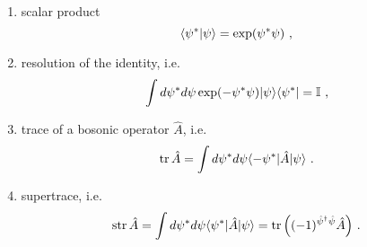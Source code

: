     \begin{enumerate}
        \item scalar product
            \begin{equation*}
                \langle\psi^*\vert\psi\rangle = \exp(\psi^* \psi) ~,
            \end{equation*}
        \item resolution of the identity, i.e. 
            \begin{equation*}
                \int d\psi^* d\psi \exp(- \psi^* \psi) \vert\psi\rangle \langle\psi^*\vert = \mathbb I ~,
            \end{equation*}
        \item trace of a bosonic operator $\hat A$, i.e. 
            \begin{equation*}
                \operatorname{tr} \hat A = \int d\psi^* d\psi \langle-\psi^*\vert \hat A \vert\psi\rangle ~.
            \end{equation*}
        \item supertrace, i.e. 
            \begin{equation*}
                \operatorname{str} \hat A = \int d\psi^* d\psi \langle\psi^*\vert \hat A \vert\psi\rangle = \operatorname{tr} \Big ((-1)^{\hat \psi^\dagger \hat \psi} \hat A \Big ) ~.
            \end{equation*}
    \end{enumerate}
